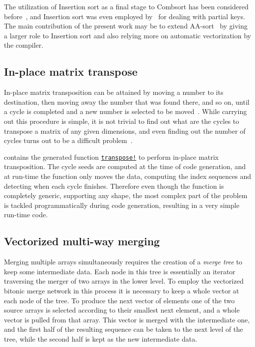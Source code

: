 \documentclass{juliacon}
\begin{document}
The utilization of Insertion sort as a final stage to Combsort has been considered before~\cite{combwiki,INCERPI198737}, and Insertion sort was even employed by~\cite{DBLP:journals/pvldb/InoueT15} for dealing with partial keys. The main contribution of the present work may be to extend AA-sort~\cite{DBLP:conf/IEEEpact/InoueMKN07,DBLP:journals/pvldb/InoueT15} by giving a larger role to Insertion sort and also relying more on automatic vectorization by the compiler.

\subsection{In-place matrix transpose}
%
In-place matrix transposition can be attained by moving a number to its destination, then moving away the number that was found there, and so on, until a cycle is completed and a new number is selected to be moved~\cite{10.1093/comjnl/2.1.47}. While carrying out this procedure is simple, it is not trivial to find out what are the cycles to transpose a matrix of any given dimensions, and even finding out the number of cycles turns out to be a difficult problem~\cite[1.3.3-12]{DBLP:books/lib/Knuth97}.

\chipsort contains the generated function \href{https://github.com/nlw0/ChipSort.jl/blob/10eb1a962e720aee2bf8733c832468b51a782c1a/src/transpose-vecs.jl#L19}{\tt transpose!} to perform in-place matrix transposition. The cycle seeds are computed at the time of code generation, and at run-time the function only moves the data, computing the index sequences and detecting when each cycle finishes. Therefore even though the function is completely generic, supporting any shape, the most complex part of the problem is tackled programmatically during code generation, resulting in a very simple run-time code.

\subsection{Vectorized multi-way merging}
%
Merging multiple arrays simultaneously requires the creation of a {\em merge tree} to keep some intermediate data. Each node in this tree is essentially an iterator traversing the merger of two arrays in the lower level. To employ the vectorized bitonic merge network in this process it is necessary to keep a whole vector at each node of the tree. To produce the next vector of elements one of the two source arrays is selected according to their smallest next element, and a whole vector is pulled from that array. This vector is merged with the intermediate one, and the first half of the resulting sequence can be taken to the next level of the tree, while the second half is kept as the new intermediate data.
\end{document}

